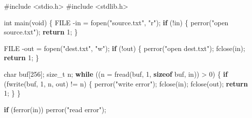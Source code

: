 \documentclass[
  letterpaper,
  DIV=11,
  numbers=noendperiod]{scrreprt}
\newenvironment{Shaded}{\begin{snugshade}}{\end{snugshade}}
\newcommand{\ControlFlowTok}[1]{\textcolor[rgb]{0.00,0.23,0.31}{\textbf{#1}}}
\newcommand{\DataTypeTok}[1]{\textcolor[rgb]{0.68,0.00,0.00}{#1}}
\newcommand{\DecValTok}[1]{\textcolor[rgb]{0.68,0.00,0.00}{#1}}
\newcommand{\ImportTok}[1]{\textcolor[rgb]{0.00,0.46,0.62}{#1}}
\newcommand{\KeywordTok}[1]{\textcolor[rgb]{0.00,0.23,0.31}{\textbf{#1}}}
\newcommand{\NormalTok}[1]{\textcolor[rgb]{0.00,0.23,0.31}{#1}}
\newcommand{\OperatorTok}[1]{\textcolor[rgb]{0.37,0.37,0.37}{#1}}
\newcommand{\PreprocessorTok}[1]{\textcolor[rgb]{0.68,0.00,0.00}{#1}}
\newcommand{\StringTok}[1]{\textcolor[rgb]{0.13,0.47,0.30}{#1}}
\begin{document}
\begin{Shaded}
\begin{Highlighting}[]
\PreprocessorTok{\#include }\ImportTok{\textless{}stdio.h\textgreater{}}
\PreprocessorTok{\#include }\ImportTok{\textless{}stdlib.h\textgreater{}}

\DataTypeTok{int}\NormalTok{ main}\OperatorTok{(}\DataTypeTok{void}\OperatorTok{)} \OperatorTok{\{}
    \DataTypeTok{FILE} \OperatorTok{{-}}\NormalTok{in }\OperatorTok{=}\NormalTok{ fopen}\OperatorTok{(}\StringTok{"source.txt"}\OperatorTok{,} \StringTok{"r"}\OperatorTok{);}
    \ControlFlowTok{if} \OperatorTok{(!}\NormalTok{in}\OperatorTok{)} \OperatorTok{\{}\NormalTok{ perror}\OperatorTok{(}\StringTok{"open source.txt"}\OperatorTok{);} \ControlFlowTok{return} \DecValTok{1}\OperatorTok{;} \OperatorTok{\}}

    \DataTypeTok{FILE} \OperatorTok{{-}}\NormalTok{out }\OperatorTok{=}\NormalTok{ fopen}\OperatorTok{(}\StringTok{"dest.txt"}\OperatorTok{,} \StringTok{"w"}\OperatorTok{);}
    \ControlFlowTok{if} \OperatorTok{(!}\NormalTok{out}\OperatorTok{)} \OperatorTok{\{}\NormalTok{ perror}\OperatorTok{(}\StringTok{"open dest.txt"}\OperatorTok{);}\NormalTok{ fclose}\OperatorTok{(}\NormalTok{in}\OperatorTok{);} \ControlFlowTok{return} \DecValTok{1}\OperatorTok{;} \OperatorTok{\}}

    \DataTypeTok{char}\NormalTok{ buf}\OperatorTok{[}\DecValTok{256}\OperatorTok{];}
    \DataTypeTok{size\_t}\NormalTok{ n}\OperatorTok{;}
    \ControlFlowTok{while} \OperatorTok{((}\NormalTok{n }\OperatorTok{=}\NormalTok{ fread}\OperatorTok{(}\NormalTok{buf}\OperatorTok{,} \DecValTok{1}\OperatorTok{,} \KeywordTok{sizeof}\NormalTok{ buf}\OperatorTok{,}\NormalTok{ in}\OperatorTok{))} \OperatorTok{\textgreater{}} \DecValTok{0}\OperatorTok{)} \OperatorTok{\{}
        \ControlFlowTok{if} \OperatorTok{(}\NormalTok{fwrite}\OperatorTok{(}\NormalTok{buf}\OperatorTok{,} \DecValTok{1}\OperatorTok{,}\NormalTok{ n}\OperatorTok{,}\NormalTok{ out}\OperatorTok{)} \OperatorTok{!=}\NormalTok{ n}\OperatorTok{)} \OperatorTok{\{}
\NormalTok{            perror}\OperatorTok{(}\StringTok{"write error"}\OperatorTok{);}
\NormalTok{            fclose}\OperatorTok{(}\NormalTok{in}\OperatorTok{);}
\NormalTok{            fclose}\OperatorTok{(}\NormalTok{out}\OperatorTok{);}
            \ControlFlowTok{return} \DecValTok{1}\OperatorTok{;}
        \OperatorTok{\}}
    \OperatorTok{\}}

    \ControlFlowTok{if} \OperatorTok{(}\NormalTok{ferror}\OperatorTok{(}\NormalTok{in}\OperatorTok{))}\NormalTok{ perror}\OperatorTok{(}\StringTok{"read error"}\OperatorTok{);}


\end{Highlighting}
\end{Shaded}
\end{document}
